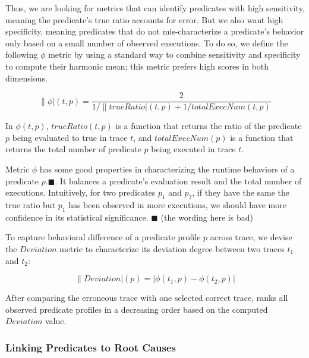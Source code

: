 Thus, we are looking for metrics that can identify
predicates with high sensitivity, meaning the predicate's true
ratio accounts for error. But we also want
high specificity, meaning predicates that do not mis-characterize
a predicate's behavior only based on a small number of
observed executions. To do so, we define the following
$\phi$ metric by using a standard way to
combine sensitivity and specificity to compute their
harmonic mean; this metric prefers high scores in both dimensions. 

\vspace{-3mm}

\[
\|\phi|(t, p) = \frac{2}{{1}/{\|trueRatio|(t, p)} + {1}/{totalExecNum(t, p)}}
\]

In $\phi(t, p)$, $trueRatio(t, p)$ is a function that returns the ratio of the predicate $p$ being
evaluated to true in trace $t$, and $totalExecNum(p)$ is a function
that returns the total number of predicate $p$ being executed in trace $t$.

Metric $\phi$ has some good properties in characterizing the
runtime behaviors of a predicate $p$.$\blacksquare$.
It balances a predicate's evaluation result and the total number of executions.
Intuitively, for two predicates $p_1$ and $p_2$, if they have the same
the true ratio but $p_1$ has been observed in more executions, we
should have more confidence in its statistical significance. $\blacksquare$
(the wording here is bad)

To capture behavioral difference of a predicate profile $p$
across trace, we devise the  $Deviation$ metric
to characterize its deviation degree between two traces $t_1$ and $t_2$:

\vspace{-3mm}

\[
\|Deviation|(p) = |\phi(t_1, p) - \phi(t_2, p)|
\]



After comparing the erroneous trace with one selected correct trace,
\ourtool ranks all observed predicate profiles in
a decreasing order based on the computed $Deviation$ value.






\subsubsection{Linking Predicates to Root Causes}
\label{sec:linking}


